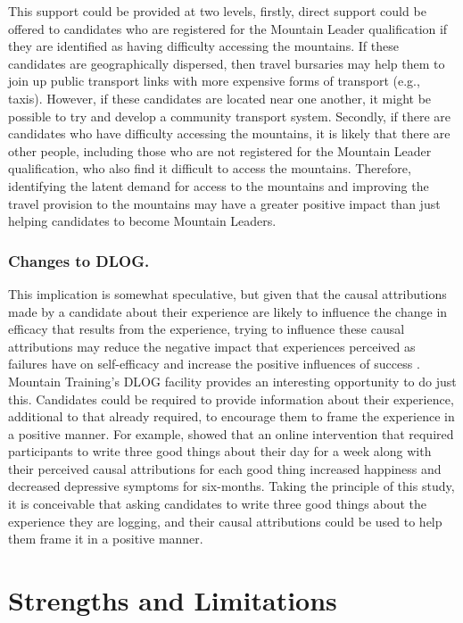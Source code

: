 \documentclass[
  12pt,
  a4paper,
]{book}
\begin{document}
This support could be provided at two levels, firstly, direct support could be offered to candidates who are registered for the Mountain Leader qualification if they are identified as having difficulty accessing the mountains. If these candidates are geographically dispersed, then travel bursaries may help them to join up public transport links with more expensive forms of transport (e.g., taxis). However, if these candidates are located near one another, it might be possible to try and develop a community transport system. Secondly, if there are candidates who have difficulty accessing the mountains, it is likely that there are other people, including those who are not registered for the Mountain Leader qualification, who also find it difficult to access the mountains. Therefore, identifying the latent demand for access to the mountains and improving the travel provision to the mountains may have a greater positive impact than just helping candidates to become Mountain Leaders.

\hypertarget{changes-to-dlog.}{%
\subsubsection{Changes to DLOG.}\label{changes-to-dlog.}}

This implication is somewhat speculative, but given that the causal attributions made by a candidate about their experience are likely to influence the change in efficacy that results from the experience, trying to influence these causal attributions may reduce the negative impact that experiences perceived as failures have on self-efficacy and increase the positive influences of success \citep[cf.~][]{Rees2005}. Mountain Training's DLOG facility provides an interesting opportunity to do just this. Candidates could be required to provide information about their experience, additional to that already required, to encourage them to frame the experience in a positive manner. For example, \citet{Seligman2005} showed that an online intervention that required participants to write three good things about their day for a week along with their perceived causal attributions for each good thing increased happiness and decreased depressive symptoms for six-months. Taking the principle of this study, it is conceivable that asking candidates to write three good things about the experience they are logging, and their causal attributions could be used to help them frame it in a positive manner.

\hypertarget{general-discussion-strenghts-limitations}{%
\section{Strengths and Limitations}\label{general-discussion-strenghts-limitations}}
\end{document}
